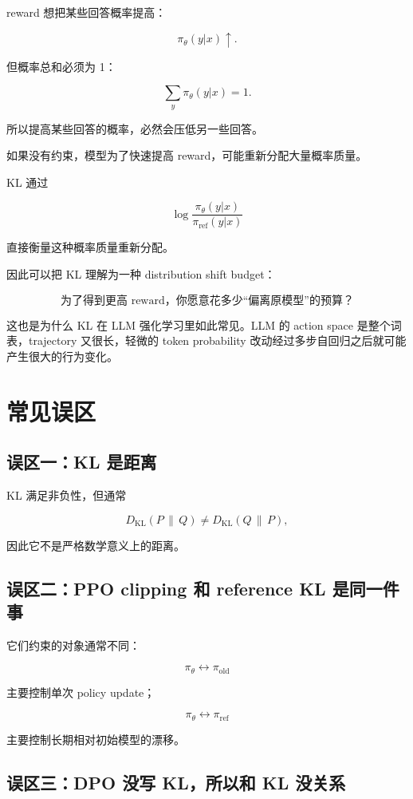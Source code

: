 \documentclass[11pt,a4paper]{ctexart}
\newcommand{\KL}[2]{D_{\mathrm{KL}}\!\left(#1\,\middle\|\,#2\right)}
\newcommand{\piold}{\pi_{\mathrm{old}}}
\newcommand{\piref}{\pi_{\mathrm{ref}}}
\newcommand{\pitheta}{\pi_{\theta}}
\begin{document}
reward 想把某些回答概率提高：

\[
\pitheta(y|x)\uparrow.
\]

但概率总和必须为 1：

\[
\sum_y\pitheta(y|x)=1.
\]

所以提高某些回答的概率，必然会压低另一些回答。

如果没有约束，模型为了快速提高 reward，可能重新分配大量概率质量。

KL 通过

\[
\log
\frac{
\pitheta(y|x)
}{
\piref(y|x)
}
\]

直接衡量这种概率质量重新分配。

因此可以把 KL 理解为一种 distribution shift budget：

\begin{equation}
\boxed{
\text{为了得到更高 reward，你愿意花多少“偏离原模型”的预算？}
}
\end{equation}

这也是为什么 KL 在 LLM 强化学习里如此常见。LLM 的 action space 是整个词表，trajectory 又很长，轻微的 token probability 改动经过多步自回归之后就可能产生很大的行为变化。

\section{常见误区}

\subsection{误区一：KL 是距离}

KL 满足非负性，但通常

\[
\KL{P}{Q}\neq\KL{Q}{P},
\]

因此它不是严格数学意义上的距离。

\subsection{误区二：PPO clipping 和 reference KL 是同一件事}

它们约束的对象通常不同：

\[
\pitheta
\leftrightarrow
\piold
\]

主要控制单次 policy update；

\[
\pitheta
\leftrightarrow
\piref
\]

主要控制长期相对初始模型的漂移。

\subsection{误区三：DPO 没写 KL，所以和 KL 没关系}
\end{document}
